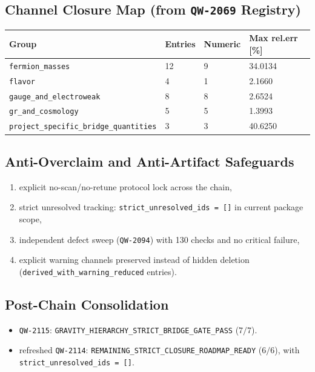 \documentclass[11pt,a4paper]{article}
\newcommand{\QW}[1]{\texttt{QW-#1}}
\newcommand{\Verdict}[1]{\texttt{#1}}
\begin{document}
\subsection{Channel Closure Map (from \QW{2069} Registry)}
\begin{center}
\begin{tabular}{p{5.1cm}p{2.1cm}p{2.1cm}p{3.6cm}}
\toprule
\textbf{Group} & \textbf{Entries} & \textbf{Numeric} & \textbf{Max rel.err [\%]} \\
\midrule
\texttt{fermion\_masses} & 12 & 9 & 34.0134 \\
\texttt{flavor} & 4 & 1 & 2.1660 \\
\texttt{gauge\_and\_electroweak} & 8 & 8 & 2.6524 \\
\texttt{gr\_and\_cosmology} & 5 & 5 & 1.3993 \\
\texttt{project\_specific\_bridge\_quantities} & 3 & 3 & 40.6250 \\
\bottomrule
\end{tabular}
\end{center}

\subsection{Anti-Overclaim and Anti-Artifact Safeguards}
\begin{enumerate}[leftmargin=1.5em]
    \item explicit no-scan/no-retune protocol lock across the chain,
    \item strict unresolved tracking: \texttt{strict\_unresolved\_ids = []} in current package scope,
    \item independent defect sweep (\QW{2094}) with 130 checks and no critical failure,
    \item explicit warning channels preserved instead of hidden deletion (\texttt{derived\_with\_warning\_reduced} entries).
\end{enumerate}

\subsection{Post-Chain Consolidation}
\begin{itemize}[leftmargin=1.4em]
    \item \QW{2115}: \Verdict{GRAVITY\_HIERARCHY\_STRICT\_BRIDGE\_GATE\_PASS} ($7/7$).
    \item refreshed \QW{2114}: \Verdict{REMAINING\_STRICT\_CLOSURE\_ROADMAP\_READY} ($6/6$), with \texttt{strict\_unresolved\_ids = []}.
\end{itemize}
\end{document}
